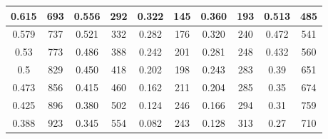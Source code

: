 \begin{table}[H]
\begin{tabular}{|cc|cc|cc|cc|cc|}
		\multicolumn{1}{|c|}{0.615}          & 693                                & \multicolumn{1}{c|}{0.556}          & 292                               & \multicolumn{1}{c|}{0.322}           & 145                   & \multicolumn{1}{c|}{0.360}      & 193                   & \multicolumn{1}{c|}{0.513}      & 485                   \\ \hline
		\multicolumn{1}{|c|}{0.579}          & 737                                & \multicolumn{1}{c|}{0.521}          & 332                               & \multicolumn{1}{c|}{0.282}           & 176                   & \multicolumn{1}{c|}{0.320}      & 240                   & \multicolumn{1}{c|}{0.472}      & 541                   \\ \hline
		\multicolumn{1}{|c|}{0.53}           & 773                                & \multicolumn{1}{c|}{0.486}          & 388                               & \multicolumn{1}{c|}{0.242}           & 201                   & \multicolumn{1}{c|}{0.281}      & 248                   & \multicolumn{1}{c|}{0.432}      & 560                   \\ \hline
		\multicolumn{1}{|c|}{0.5}            & 829                                & \multicolumn{1}{c|}{0.450}          & 418                               & \multicolumn{1}{c|}{0.202}           & 198                   & \multicolumn{1}{c|}{0.243}      & 283                   & \multicolumn{1}{c|}{0.39}       & 651                   \\ \hline
		\multicolumn{1}{|c|}{0.473}          & 856                                & \multicolumn{1}{c|}{0.415}          & 460                               & \multicolumn{1}{c|}{0.162}           & 211                   & \multicolumn{1}{c|}{0.204}      & 285                   & \multicolumn{1}{c|}{0.35}       & 674                   \\ \hline
		\multicolumn{1}{|c|}{0.425}          & 896                                & \multicolumn{1}{c|}{0.380}          & 502                               & \multicolumn{1}{c|}{0.124}           & 246                   & \multicolumn{1}{c|}{0.166}      & 294                   & \multicolumn{1}{c|}{0.31}       & 759                   \\ \hline
		\multicolumn{1}{|c|}{0.388}          & 923                                & \multicolumn{1}{c|}{0.345}          & 554                               & \multicolumn{1}{c|}{0.082}           & 243                   & \multicolumn{1}{c|}{0.128}      & 313                   & \multicolumn{1}{c|}{0.27}       & 710                   \\ \hline

\end{tabular}
\end{table}
